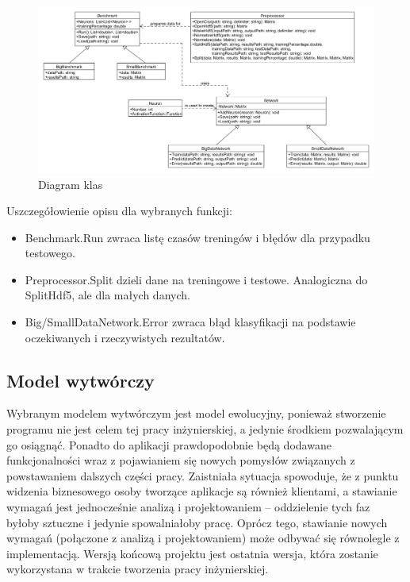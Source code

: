 \documentclass{article}
\begin{document}
\begin{figure}[H]
\hspace*{-2cm}
\includegraphics[width=16cm]{classes.png}
\caption{Diagram klas}
\end{figure}

Uszczegółowienie opisu dla wybranych funkcji:
\begin{itemize}
\item Benchmark.Run zwraca listę czasów treningów i błędów dla przypadku testowego.
\item Preprocessor.Split dzieli dane na treningowe i testowe. Analogiczna do SplitHdf5, ale dla małych danych.
\item Big/SmallDataNetwork.Error zwraca błąd klasyfikacji na podstawie oczekiwanych i rzeczywistych rezultatów.
\end{itemize}

\subsection{Model wytwórczy}
Wybranym modelem wytwórczym jest model ewolucyjny, ponieważ stworzenie programu nie jest celem tej pracy inżynierskiej, a jedynie środkiem pozwalającym go osiągnąć. Ponadto do aplikacji prawdopodobnie będą dodawane funkcjonalności wraz z pojawianiem się nowych pomysłów związanych z powstawaniem dalszych części pracy. Zaistniała sytuacja spowoduje, że z punktu widzenia biznesowego osoby tworzące aplikacje są również klientami, a stawianie wymagań jest jednocześnie analizą i projektowaniem -- oddzielenie tych faz byłoby sztuczne i jedynie spowalniałoby pracę. Oprócz tego, stawianie nowych wymagań (połączone z analizą i projektowaniem) może odbywać się równolegle z implementacją. Wersją końcową projektu jest ostatnia wersja, która zostanie wykorzystana w trakcie tworzenia pracy inżynierskiej.
\end{document}
